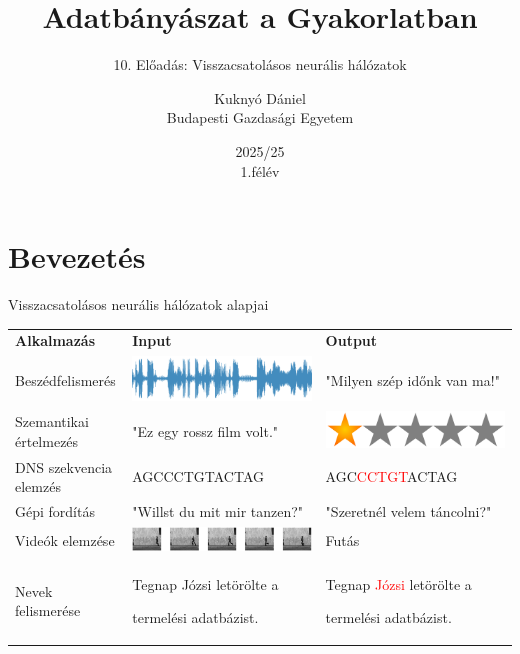 \documentclass[english, aspectratio=169]{beamer}
\makeatletter
\newcommand\makebeamertitle{\frame{\maketitle}}
\let\origtableofcontents=\tableofcontents
\def\tableofcontents{\@ifnextchar[{\origtableofcontents}{\gobbletableofcontents}}
\def\gobbletableofcontents#1{\origtableofcontents}
\makeatother
\begin{document}
\section{Bevezetés}
\title[]{Adatbányászat a Gyakorlatban}
\subtitle{10. Előadás: Visszacsatolásos neurális hálózatok}
\author[Kuknyó Dániel]{Kuknyó Dániel\\Budapesti Gazdasági Egyetem}
\date{2025/25\\1.félév}
\makebeamertitle

\begin{frame}
\tableofcontents{}
\end{frame}

\begin{frame}
\tableofcontents[currentsection]
\end{frame}


\begin{frame}{Visszacsatolásos neurális hálózatok alapjai}
\renewcommand{\arraystretch}{2.}
\begin{tabularx}{\textwidth}{m{4cm}m{5cm}m{5cm}}
\textbf{Alkalmazás} & \textbf{Input} & \textbf{Output} \\
	Beszédfelismerés & \includegraphics[width=.25\textwidth, keepaspectratio]{images/recurrent_1.png} & "Milyen szép időnk van ma!" \\
	Szemantikai értelmezés & "Ez egy rossz film volt." & \includegraphics[width=.2\textwidth, keepaspectratio]{images/recurrent_2.png} \\
	DNS szekvencia elemzés & AGCCCTGTACTAG & AGC\textcolor{red}{CCTGT}ACTAG \\
	Gépi fordítás & "Willst du mit mir tanzen?" & "Szeretnél velem táncolni?" \\
	Videók elemzése & \includegraphics[width=.3\textwidth, keepaspectratio]{images/recurrent_3.png} & Futás \\
	Nevek felismerése & Tegnap Józsi letörölte a\par termelési adatbázist. & Tegnap
\textcolor{red}{Józsi} letörölte a\par termelési adatbázist. \\
\end{tabularx}
\end{frame}
\end{document}
